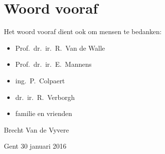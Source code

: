 \newpage


\chapter*{Woord vooraf}


\begin{slshape}


Het woord vooraf dient ook om mensen te bedanken: 

\begin{itemize}
\item Prof.~dr.~ir.~R.~Van de Walle
\item Prof.~dr.~ir.~E.~Mannens
\item ing.~P.~Colpaert
\item dr.~ir.~R.~Verborgh
\item familie en vrienden
\end{itemize}

\vspace{4ex}

\hfill Brecht Van de Vyvere

\hfill Gent 30 januari 2016

\end{slshape}

